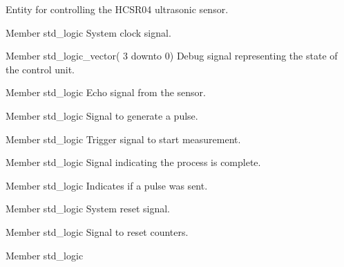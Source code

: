 \begin{DoxyRefList}
%
 Entity for controlling the HCSR04 ultrasonic sensor.  
\item[Member \doxylink{classhcsr04__ctrl_ac7d2714e799fc3b1af36d5ebbc3c3564}{hcsr04\+\_\+ctrl.clock} std\+\_\+logic ]\label{brief__brief000096}%
%
 System clock signal.  
\item[Member \doxylink{classhcsr04__ctrl_a6b5bfff0fc8a6aa092a71c69ed92822f}{hcsr04\+\_\+ctrl.db\+\_\+estado} std\+\_\+logic\+\_\+vector( 3 downto  0) ]\label{brief__brief000108}%
%
 Debug signal representing the state of the control unit.  
\item[Member \doxylink{classhcsr04__ctrl_a6b5c00a7cdd7df827680371cea5a815e}{hcsr04\+\_\+ctrl.echo} std\+\_\+logic ]\label{brief__brief000099}%
%
 Echo signal from the sensor.  
\item[Member \doxylink{classhcsr04__ctrl_a686849a232320b41e5541cc0566c350c}{hcsr04\+\_\+ctrl.generate\+\_\+pulse} std\+\_\+logic ]\label{brief__brief000102}%
%
 Signal to generate a pulse.  
\item[Member \doxylink{classhcsr04__ctrl_aa5fbb6d3d35eae436714f958dd5b9eee}{hcsr04\+\_\+ctrl.mensurar} std\+\_\+logic ]\label{brief__brief000098}%
%
 Trigger signal to start measurement.  
\item[Member \doxylink{classhcsr04__ctrl_a9b8c532fce6acef2d3050ba3876c13eb}{hcsr04\+\_\+ctrl.pronto} std\+\_\+logic ]\label{brief__brief000107}%
%
 Signal indicating the process is complete.  
\item[Member \doxylink{classhcsr04__ctrl_ac83f68cbbc9928bc5acfbcc8e83ea407}{hcsr04\+\_\+ctrl.pulse\+\_\+sent} std\+\_\+logic ]\label{brief__brief000100}%
%
 Indicates if a pulse was sent.  
\item[Member \doxylink{classhcsr04__ctrl_a108f6801ba4104063b9d5f9286194302}{hcsr04\+\_\+ctrl.reset} std\+\_\+logic ]\label{brief__brief000097}%
%
 System reset signal.  
\item[Member \doxylink{classhcsr04__ctrl_ada4e6b0d9659b2741d41de9e476d608d}{hcsr04\+\_\+ctrl.reset\+\_\+counters} std\+\_\+logic ]\label{brief__brief000103}%
%
 Signal to reset counters.  
\item[Member \doxylink{classhcsr04__ctrl_a54374e0f546c44acc926c1f7f79fc412}{hcsr04\+\_\+ctrl.reset\+\_\+watchdog} std\+\_\+logic ]\label{brief__brief000106}%

\end{DoxyRefList}
